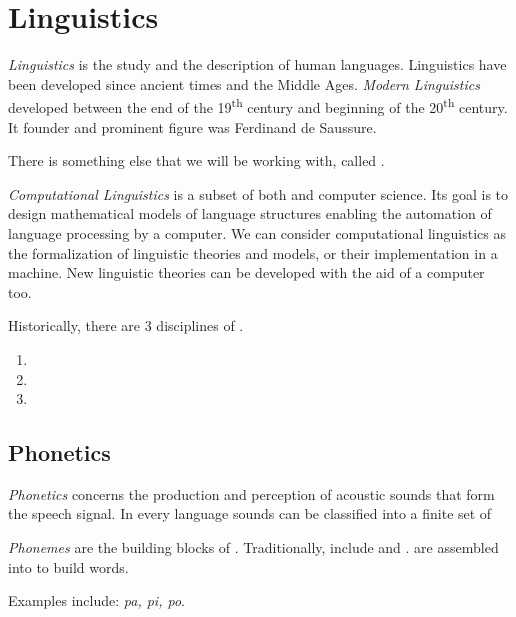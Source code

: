 \section{Linguistics} \label{sec:Linguistics}
\begin{definition}[Linguistics] \label{def:Linguistics}
  \emph{Linguistics} is the study and the description of human languages.
  Linguistics have been developed since ancient times and the Middle Ages.
  \emph{Modern Linguistics} developed between the end of the 19\textsuperscript{th} century and beginning of the 20\textsuperscript{th} century.
  It founder and prominent figure was Ferdinand de Saussure.
\end{definition}

There is something else that we will be working with, called .
\begin{definition} \label{def:Computational Linguistics}
  \emph{Computational Linguistics} is a subset of both  and computer science.
  Its goal is to design mathematical models of language structures enabling the automation of language processing by a computer.
  We can consider computational linguistics as the formalization of linguistic theories and models, or their implementation in a machine.
  New linguistic theories can be developed with the aid of a computer too.
\end{definition}

Historically, there are 3 disciplines of .
\begin{enumerate}
  \item {}
  \item {}
  \item {}
\end{enumerate}

\subsection{Phonetics} \label{subsec:Phonetics}
\begin{definition}[Phonetics] \label{def:Phonetics}
  \emph{Phonetics} concerns the production and perception of acoustic sounds that form the speech signal.
  In every language sounds can be classified into a finite set of 
\end{definition}

\begin{definition}[Phonemes] \label{def:Phonemes}
  \emph{Phonemes} are the building blocks of .
  Traditionally,  include  and .
   are assembled into  to build words.
  
  Examples include: \emph{pa, pi, po}.
\end{definition}

